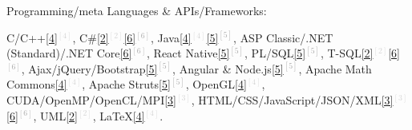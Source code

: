 

\begin{cventries}

\vspace{-0.25cm}

  \cventry
    {Programming/meta Languages \& APIs/Frameworks:} %
    {} %
    {} %
    {} %
    {
      \vspace{0.1cm}     
      \begin{cvitems} %
        \item[] {
		\textcolor{rainbowcolor-indigo}{C/C++\textcolor{lightgray}{\ref{4}{$^{[4]}$}}},
		\textcolor{rainbowcolor-indigo}{C\#\textcolor{lightgray}{\ref{2}{$^{[2]}$}}\textcolor{darkgray}{\ref{6}{$^{[6]}$}}},
		\textcolor{rainbowcolor-indigo}{Java\textcolor{lightgray}{\ref{4}{$^{[4]}$}}\textcolor{darkgray}{\ref{5}{$^{[5]}$}}},
		\textcolor{rainbowcolor-indigo}{ASP Classic/.NET (Standard)/.NET Core\textcolor{darkgray}{\ref{6}{$^{[6]}$}}},	
		\textcolor{rainbowcolor-indigo}{React Native\textcolor{darkgray}{\ref{5}{$^{[5]}$}}},		
		\textcolor{rainbowcolor-indigo}{PL/SQL\textcolor{darkgray}{\ref{5}{$^{[5]}$}}},
		\textcolor{rainbowcolor-indigo}{T-SQL\textcolor{lightgray}{\ref{2}{$^{[2]}$}}\textcolor{darkgray}{\ref{6}{$^{[6]}$}}},
		\textcolor{rainbowcolor-indigo}{Ajax/jQuery/Bootstrap\textcolor{darkgray}{\ref{5}{$^{[5]}$}}},
		\textcolor{rainbowcolor-indigo}{Angular %
	    	\& Node.js\textcolor{darkgray}{\ref{5}{$^{[5]}$}}},
        \textcolor{rainbowcolor-indigo}{Apache Math Commons\textcolor{lightgray}{\ref{4}{$^{[4]}$}}},  
	    \textcolor{rainbowcolor-indigo}{Apache Struts\textcolor{darkgray}{\ref{5}{$^{[5]}$}}},
	    \textcolor{rainbowcolor-indigo}{OpenGL\textcolor{lightgray}{\ref{4}{$^{[4]}$}}},
	    \textcolor{rainbowcolor-indigo}{CUDA/OpenMP/OpenCL/MPI\textcolor{lightgray}{\ref{3}{$^{[3]}$}}},
	    \textcolor{rainbowcolor-indigo}{HTML/CSS/JavaScript/JSON/XML\textcolor{lightgray}{\ref{3}{$^{[3]}$}}\textcolor{darkgray}{\ref{6}{$^{[6]}$}}},
	    \textcolor{rainbowcolor-indigo}{UML\textcolor{lightgray}{\ref{2}{$^{[2]}$}}},
	    \textcolor{rainbowcolor-indigo}{LaTeX\textcolor{lightgray}{\ref{4}{$^{[4]}$}}}.
	    }
	  \end{cvitems}
    }  


\end{cventries}
